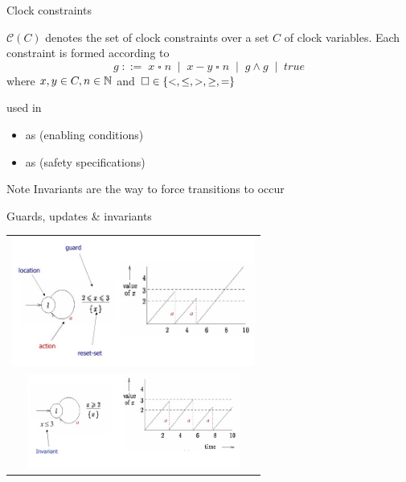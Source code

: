\documentclass[aspectratio=169]{beamer}
\def\cc#1{\mathcal{C}(#1)}
\begin{document}
\begin{slide}{Clock constraints}
\small

$\cc{C}$ denotes the  set of clock constraints over a set $C$ of clock variables.
Each constraint is formed according to 
\begin{equation*}
g \; ::=\; x \mathbin{\square} n \; \mid\; x - y \mathbin{\square} n  \; \mid\; g \land g \;\mid\; true
\end{equation*}
where $x,y \in C, n \in \mathbb{N}$ and $\square \in \left\{ <,\leq,>,\geq,= \right\}$


used in
\begin{itemize}
\item  {} as  (enabling conditions)
\item  {} as  (safety specifications)
\end{itemize}

\begin{block}{Note}
Invariants are the  way to force transitions to occur
\end{block}
\end{slide}

\begin{slide}{Guards, updates \&  invariants}
\small \centering

\begin{tabular}{c}
   \includegraphics[width=8cm]{./images/model0.jpg} \\  \includegraphics[width=7cm]{./images/model1.jpg}
\end{tabular}

\end{slide}
\end{document}
